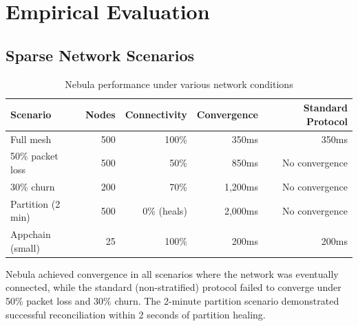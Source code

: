 \section{Empirical Evaluation}

\label{sec:evaluation}

\subsection{Sparse Network Scenarios}

\begin{table}[h]
\centering
\begin{tabular}{@{}lrrrr@{}}
\toprule
\textbf{Scenario} & \textbf{Nodes} & \textbf{Connectivity} & \textbf{Convergence} & \textbf{Standard Protocol} \\
\midrule
Full mesh & 500 & 100\% & 350ms & 350ms \\
50\% packet loss & 500 & 50\% & 850ms & No convergence \\
30\% churn & 200 & 70\% & 1,200ms & No convergence \\
Partition (2 min) & 500 & 0\% (heals) & 2,000ms & No convergence \\
Appchain (small) & 25 & 100\% & 200ms & 200ms \\
\bottomrule
\end{tabular}
\caption{Nebula performance under various network conditions}
\label{tab:nebula-results}
\end{table}

Nebula achieved convergence in all scenarios where the network was eventually connected,
while the standard (non-stratified) protocol failed to converge under 50\% packet loss
and 30\% churn. The 2-minute partition scenario demonstrated successful reconciliation
within 2 seconds of partition healing.


